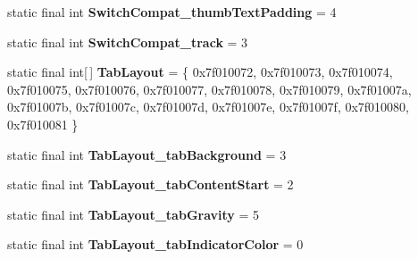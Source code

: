 \begin{DoxyCompactItemize}
\item 
\hypertarget{classandroid_1_1support_1_1design_1_1_r_1_1styleable_aaa78829f09f5da58830c4fd391b6e65c}{}static final int {\bfseries Switch\+Compat\+\_\+thumb\+Text\+Padding} = 4\label{classandroid_1_1support_1_1design_1_1_r_1_1styleable_aaa78829f09f5da58830c4fd391b6e65c}

\item 
\hypertarget{classandroid_1_1support_1_1design_1_1_r_1_1styleable_a1257745831bcf4c1a0c1a5c8c393c9b2}{}static final int {\bfseries Switch\+Compat\+\_\+track} = 3\label{classandroid_1_1support_1_1design_1_1_r_1_1styleable_a1257745831bcf4c1a0c1a5c8c393c9b2}

\item 
\hypertarget{classandroid_1_1support_1_1design_1_1_r_1_1styleable_a514b47b47f600f9421b65f4f0aa832d6}{}static final int\mbox{[}$\,$\mbox{]} {\bfseries Tab\+Layout} = \{ 0x7f010072, 0x7f010073, 0x7f010074, 0x7f010075, 0x7f010076, 0x7f010077, 0x7f010078, 0x7f010079, 0x7f01007a, 0x7f01007b, 0x7f01007c, 0x7f01007d, 0x7f01007e, 0x7f01007f, 0x7f010080, 0x7f010081 \}\label{classandroid_1_1support_1_1design_1_1_r_1_1styleable_a514b47b47f600f9421b65f4f0aa832d6}

\item 
\hypertarget{classandroid_1_1support_1_1design_1_1_r_1_1styleable_a820be00d91c860d611f8d23069a85668}{}static final int {\bfseries Tab\+Layout\+\_\+tab\+Background} = 3\label{classandroid_1_1support_1_1design_1_1_r_1_1styleable_a820be00d91c860d611f8d23069a85668}

\item 
\hypertarget{classandroid_1_1support_1_1design_1_1_r_1_1styleable_a5b71a6c0e3a9a65823285cd0c3ab9e41}{}static final int {\bfseries Tab\+Layout\+\_\+tab\+Content\+Start} = 2\label{classandroid_1_1support_1_1design_1_1_r_1_1styleable_a5b71a6c0e3a9a65823285cd0c3ab9e41}

\item 
\hypertarget{classandroid_1_1support_1_1design_1_1_r_1_1styleable_a7ae8ebe621a45d0943d8ab3dce402abc}{}static final int {\bfseries Tab\+Layout\+\_\+tab\+Gravity} = 5\label{classandroid_1_1support_1_1design_1_1_r_1_1styleable_a7ae8ebe621a45d0943d8ab3dce402abc}

\item 
\hypertarget{classandroid_1_1support_1_1design_1_1_r_1_1styleable_a9b013b480dde8c6e5d57cd6ebd0d0f53}{}static final int {\bfseries Tab\+Layout\+\_\+tab\+Indicator\+Color} = 0\label{classandroid_1_1support_1_1design_1_1_r_1_1styleable_a9b013b480dde8c6e5d57cd6ebd0d0f53}


\end{DoxyCompactItemize}
